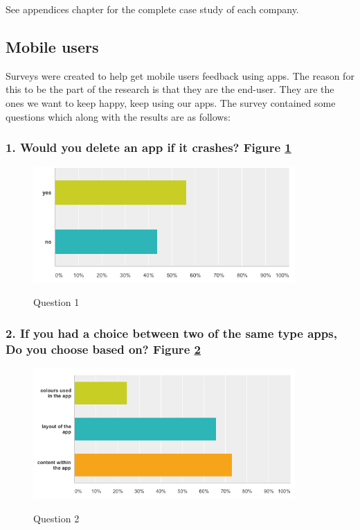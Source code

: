 See appendices chapter for the complete case study of each company. 

\subsection{Mobile users} \label{research:mobile_users}

Surveys were created to help get mobile users feedback using apps. The reason for this to be the part of the research is that they are the end-user. They are the ones we want to keep happy, keep using our apps. The survey contained some questions which along with the results are as follows:

\subsubsection{1. Would you delete an app if it crashes? Figure \ref{fig:label1}}

\begin{figure}[!h]
    \caption{Question 1}
    \centering
    \includegraphics[width=100mm]{images/survey/crashes}
    \label{fig:label1}
\end{figure}

\subsubsection{2. If you had a choice between two of the same type apps, Do you choose based on?  Figure \ref{fig:label2}}

\begin{figure}[!h]
    \caption{Question 2}
    \centering
    \includegraphics[width=100mm]{images/survey/choose}
    \label{fig:label2}
\end{figure}

